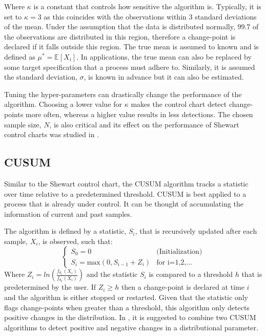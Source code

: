 Where $\kappa$ is a constant that controls how sensitive the algorithm is. Typically, it is set to $\kappa=3$ as this coincides with the observations within $3$ standard deviations of the mean. Under the assumption that the data is distributed normally, $99.7$ of the observations are distributed in this region, therefore a change-point is declared if it falls outside this region. The true mean is assumed to known and is defined as $\mu^* = \mathbb{E}[X_i]$. In applications, the true mean can also be replaced by some target specification that a process must adhere to. Similarly, it is assumed the standard deviation, $\sigma$, is known in advance but it can also be estimated.

Tuning the hyper-parameters can drastically change the performance of the algorithm. Choosing a lower value for $\kappa$ makes the control chart detect change-points more often, whereas a higher value results in less detections. The chosen sample size, $N$, is also critical and its effect on the performance of Shewart control charts was studied in \cite{haridy2017effect}.

\subsection{CUSUM}
Similar to the Shewart control chart, the CUSUM algorithm tracks a statistic over time relative to a predetermined threshold. CUSUM is best applied to a process that is already under control. It can be thought of accumulating the information of current and past samples. 

The algorithm is defined by a statistic, $S_i$,  that is recursively updated after each sample, $X_i$, is observed, such that:
\begin{equation}
  \begin{cases}
    S_0 = 0  & \text{(Initialization)} \\
    S_i = \text{max}(0, S_{i-1} + Z_i) & \text{for i=1,2,...}
  \end{cases}
\end{equation}
Where $Z_i=ln(\frac{f_{\theta_1}(X_i)}{f_{\theta_0}(X_i)})$ and the statistic $S_i$ is compared to a threshold $h$ that is predetermined by the user. If $Z_i \geq h$ then a change-point is declared at time $i$ and the algorithm is either stopped or restarted. Given that the statistic only flags change-points when greater than a threshold, this algorithm only detects positive changes in the distribution. In \cite{page1954continuous}, it is suggested to combine two CUSUM algorithms to detect positive and negative changes in a distributional parameter.

